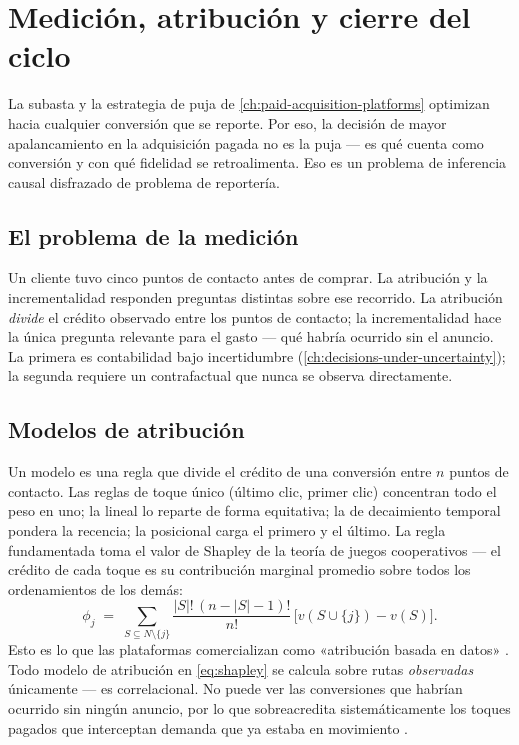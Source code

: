 \chapter{Medición, atribución y cierre del ciclo}\label{ch:attribution-and-measurement}


La subasta y la estrategia de puja de \cref{ch:paid-acquisition-platforms} optimizan hacia cualquier conversión que se reporte. Por eso, la decisión de mayor apalancamiento en la adquisición pagada no es la puja --- es qué cuenta como conversión y con qué fidelidad se retroalimenta. Eso es un problema de inferencia causal disfrazado de problema de reportería.

\section{El problema de la medición}\label{sec:measurement-problem}

Un cliente tuvo cinco puntos de contacto antes de comprar. La atribución y la incrementalidad responden preguntas distintas sobre ese recorrido. La atribución \emph{divide} el crédito observado entre los puntos de contacto; la incrementalidad hace la única pregunta relevante para el gasto --- qué habría ocurrido sin el anuncio. La primera es contabilidad bajo incertidumbre (\cref{ch:decisions-under-uncertainty}); la segunda requiere un contrafactual que nunca se observa directamente.

\section{Modelos de atribución}\label{sec:attribution-models}

Un modelo es una regla que divide el crédito de una conversión entre $n$ puntos de contacto. Las reglas de toque único (último clic, primer clic) concentran todo el peso en uno; la lineal lo reparte de forma equitativa; la de decaimiento temporal pondera la recencia; la posicional carga el primero y el último. La regla fundamentada toma el valor de Shapley de la teoría de juegos cooperativos --- el crédito de cada toque es su contribución marginal promedio sobre todos los ordenamientos de los demás:
\begin{equation}\label{eq:shapley}
  \phi_j \;=\; \sum_{S\subseteq N\setminus\{j\}} \frac{|S|!\,(n-|S|-1)!}{n!}\,\bigl[v(S\cup\{j\})-v(S)\bigr].
\end{equation}
Esto es lo que las plataformas comercializan como «atribución basada en datos» \parencite{li2014attributing,gads6259715,ga10596866}. Todo modelo de atribución en \cref{eq:shapley} se calcula sobre rutas \emph{observadas} únicamente --- es correlacional. No puede ver las conversiones que habrían ocurrido sin ningún anuncio, por lo que sobreacredita sistemáticamente los toques pagados que interceptan demanda que ya estaba en movimiento \parencite{anderl2016mapping,berman2018economics}.

